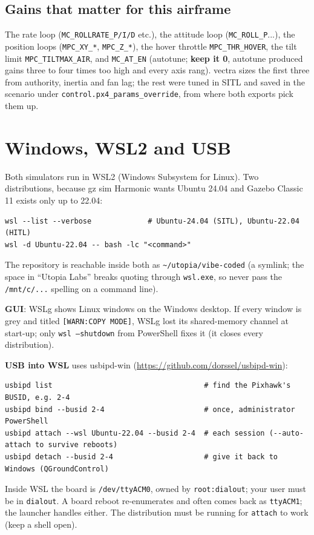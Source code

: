 \documentclass[11pt,a4paper]{article}
\newcommand{\file}[1]{\texttt{#1}}
\newcommand{\param}[1]{\texttt{#1}}
\begin{document}
\subsection{Gains that matter for this airframe}
The rate loop (\param{MC\_ROLLRATE\_P/I/D} etc.), the attitude loop (\param{MC\_ROLL\_P}...),
the position loops (\param{MPC\_XY\_*}, \param{MPC\_Z\_*}), the hover throttle
\param{MPC\_THR\_HOVER}, the tilt limit \param{MPC\_TILTMAX\_AIR}, and \param{MC\_AT\_EN}
(autotune; \textbf{keep it 0}, autotune produced gains three to four times too high and every axis
rang). vectra sizes the first three from authority, inertia and fan lag; the rest were tuned in
SITL and saved in the scenario under \param{control.px4\_params\_override}, from where both
exports pick them up.

\section{Windows, WSL2 and USB}

Both simulators run in WSL2 (Windows Subsystem for Linux). Two distributions, because gz sim
Harmonic wants Ubuntu 24.04 and Gazebo Classic 11 exists only up to 22.04:
\begin{lstlisting}
wsl --list --verbose             # Ubuntu-24.04 (SITL), Ubuntu-22.04 (HITL)
wsl -d Ubuntu-22.04 -- bash -lc "<command>"
\end{lstlisting}
The repository is reachable inside both as \file{\textasciitilde/utopia/vibe-coded} (a symlink;
the space in ``Utopia Labs'' breaks quoting through \file{wsl.exe}, so never pass the
\file{/mnt/c/...} spelling on a command line).

\textbf{GUI}: WSLg shows Linux windows on the Windows desktop. If every window is grey and
titled \texttt{[WARN:COPY MODE]}, WSLg lost its shared-memory channel at start-up; only
\file{wsl --shutdown} from PowerShell fixes it (it closes every distribution).

\textbf{USB into WSL} uses usbipd-win (\url{https://github.com/dorssel/usbipd-win}):
\begin{lstlisting}
usbipd list                                   # find the Pixhawk's BUSID, e.g. 2-4
usbipd bind --busid 2-4                       # once, administrator PowerShell
usbipd attach --wsl Ubuntu-22.04 --busid 2-4  # each session (--auto-attach to survive reboots)
usbipd detach --busid 2-4                     # give it back to Windows (QGroundControl)
\end{lstlisting}
Inside WSL the board is \file{/dev/ttyACM0}, owned by \file{root:dialout}; your user must be in
\file{dialout}. A board reboot re-enumerates and often comes back as \file{ttyACM1}; the launcher
handles either. The distribution must be running for \file{attach} to work (keep a shell open).
\end{document}
